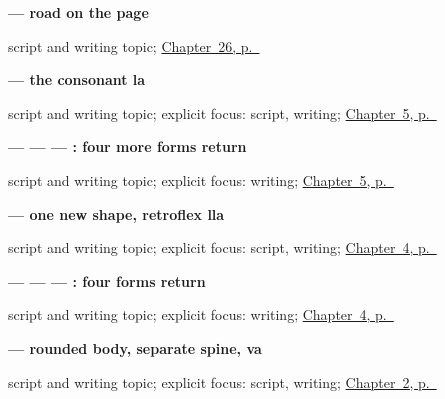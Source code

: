 \noindent\begin{minipage}[t]{\linewidth}
\raggedright
\textbf{ — road on the page}\par
\footnotesize script and writing topic; \hyperref[ch:gu-city-school-road]{Chapter~26, p.~\pageref*{ch:gu-city-school-road}}
\end{minipage}\par\smallskip

\noindent\begin{minipage}[t]{\linewidth}
\raggedright
\textbf{ — the consonant la}\par
\footnotesize script and writing topic; explicit focus: script, writing; \hyperref[ch:gu-first-use-forms-b]{Chapter~5, p.~\pageref*{ch:gu-first-use-forms-b}}
\end{minipage}\par\smallskip

\noindent\begin{minipage}[t]{\linewidth}
\raggedright
\textbf{ —  —  — : four more forms return}\par
\footnotesize script and writing topic; explicit focus: writing; \hyperref[ch:gu-first-use-forms-b]{Chapter~5, p.~\pageref*{ch:gu-first-use-forms-b}}
\end{minipage}\par\smallskip

\noindent\begin{minipage}[t]{\linewidth}
\raggedright
\textbf{ — one new shape, retroflex lla}\par
\footnotesize script and writing topic; explicit focus: script, writing; \hyperref[ch:gu-first-use-forms-a]{Chapter~4, p.~\pageref*{ch:gu-first-use-forms-a}}
\end{minipage}\par\smallskip

\noindent\begin{minipage}[t]{\linewidth}
\raggedright
\textbf{ —  —  — : four forms return}\par
\footnotesize script and writing topic; explicit focus: writing; \hyperref[ch:gu-first-use-forms-a]{Chapter~4, p.~\pageref*{ch:gu-first-use-forms-a}}
\end{minipage}\par\smallskip

\noindent\begin{minipage}[t]{\linewidth}
\raggedright
\textbf{ — rounded body, separate spine, va}\par
\footnotesize script and writing topic; explicit focus: script, writing; \hyperref[ch:greetings]{Chapter~2, p.~\pageref*{ch:greetings}}
\end{minipage}\par\smallskip


